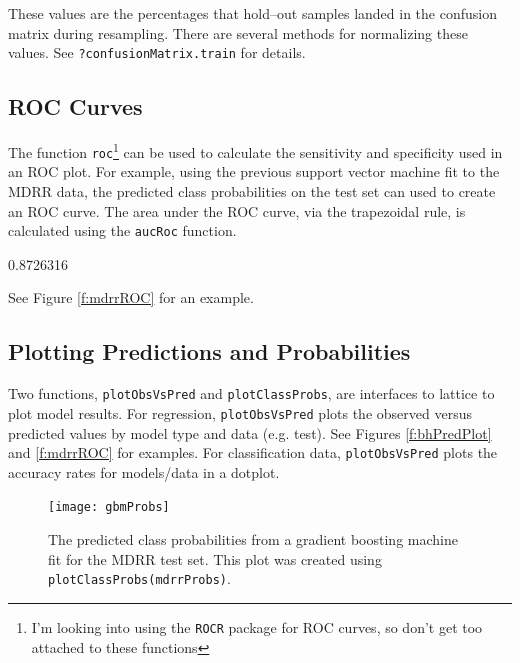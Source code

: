 \documentclass[12pt]{article}
\newcommand{\code}[1]{\mbox{\footnotesize\color{darkblue}\texttt{#1}}}
\renewenvironment{Schunk}{\vspace{\topsep}}{\vspace{\topsep}}
\begin{document}
These values are the percentages that hold--out samples landed in the
confusion matrix during resampling. There are several methods for
normalizing these values. See \code{?confusionMatrix.train} for details.


\subsection{ROC Curves}\label{S:roc}

The function \code{roc}\footnote{I'm looking into using the
  \texttt{ROCR} package for ROC curves, so don't get too attached to
  these functions} can be used to calculate the sensitivity and
specificity used in an ROC plot. For example, using the previous
support vector machine fit to the MDRR data, the predicted class
probabilities on the test set can used to create an ROC curve. The
area under the ROC curve, via the trapezoidal rule, is calculated
using the \code{aucRoc} function.  

\begin{small}
\begin{Schunk}
\begin{Soutput}
[1] 0.8726316
\end{Soutput}
\end{Schunk}
\end{small}

See Figure \ref{f:mdrrROC} for an example.

\subsection*{Plotting Predictions and Probabilities}

Two functions, \code{plotObsVsPred} and \code{plotClassProbs}, are
interfaces to lattice to plot model results. For regression,
\code{plotObsVsPred} plots the observed versus predicted values by
model type and data (e.g. test). See Figures \ref{f:bhPredPlot} and
\ref{f:mdrrROC}  for examples. For classification data,
\code{plotObsVsPred} plots the accuracy rates for models/data in a
dotplot.  



\begin{figure}
   \begin{center}      
      \texttt{[image: gbmProbs]}   
      \caption{The predicted class probabilities from a gradient boosting machine fit for the MDRR test set. This plot was created using \code{plotClassProbs(mdrrProbs)}.}
      \label{f:mdrrProbs}     
   \end{center}
\end{figure}  
\end{document}
